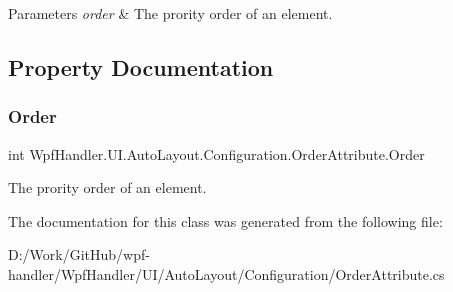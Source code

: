 \begin{DoxyParams}{Parameters}
{\em order} & The prority order of an element.\\
\hline
\end{DoxyParams}


\subsection{Property Documentation}
\mbox{\label{class_wpf_handler_1_1_u_i_1_1_auto_layout_1_1_configuration_1_1_order_attribute_af216fd2b8c66cf70d39b0904793c345a}} 
\subsubsection{\texorpdfstring{Order}{Order}}
{\footnotesize\ttfamily int Wpf\+Handler.\+U\+I.\+Auto\+Layout.\+Configuration.\+Order\+Attribute.\+Order\hspace{0.3cm}{\ttfamily [get]}}



The prority order of an element. 



The documentation for this class was generated from the following file\+:\begin{DoxyCompactItemize}
\item 
D\+:/\+Work/\+Git\+Hub/wpf-\/handler/\+Wpf\+Handler/\+U\+I/\+Auto\+Layout/\+Configuration/Order\+Attribute.\+cs\end{DoxyCompactItemize}
